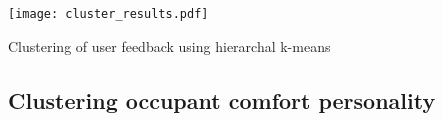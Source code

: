 
\begin{center}
\texttt{[image: cluster\_results.pdf]}
\caption{Clustering of user feedback using hierarchal k-means}
\label{fig:clustering}
\end{center}






\subsection{Clustering occupant comfort personality}




